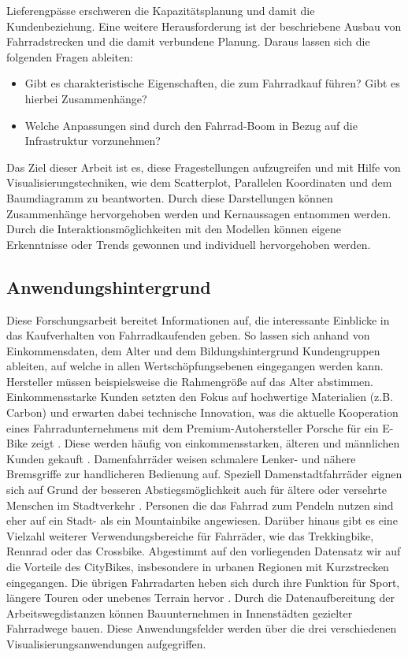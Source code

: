 \documentclass[usegeometry=true]{scrartcl}
\begin{document}
Lieferengpässe erschweren die Kapazitätsplanung und damit die Kundenbeziehung. Eine weitere Herausforderung ist der beschriebene Ausbau von Fahrradstrecken und die damit verbundene Planung. Daraus lassen sich die folgenden Fragen ableiten:
\begin{itemize}
\item Gibt es charakteristische Eigenschaften, die zum Fahrradkauf führen? Gibt es hierbei Zusammenhänge?
\item Welche Anpassungen sind durch den Fahrrad-Boom in Bezug auf die Infrastruktur vorzunehmen?
\end{itemize}
Das Ziel dieser Arbeit ist es, diese Fragestellungen  aufzugreifen und mit Hilfe von Visualisierungstechniken, wie dem Scatterplot, Parallelen Koordinaten und dem Baumdiagramm zu beantworten. Durch diese Darstellungen können Zusammenhänge hervorgehoben werden und Kernaussagen entnommen werden. Durch die Interaktionsmöglichkeiten mit den Modellen können eigene Erkenntnisse oder Trends gewonnen und individuell hervorgehoben werden.    

\subsection{Anwendungshintergrund}


Diese Forschungsarbeit bereitet Informationen auf, die interessante Einblicke in das Kaufverhalten von Fahrradkaufenden geben. So lassen sich anhand von Einkommensdaten, dem Alter und dem Bildungshintergrund Kundengruppen ableiten, auf welche in allen Wertschöpfungsebenen eingegangen werden kann. Hersteller müssen beispielsweise die Rahmengröße auf das Alter abstimmen. Einkommensstarke Kunden setzten den Fokus auf hochwertige Materialien (z.B. Carbon) und erwarten dabei technische Innovation, was die aktuelle Kooperation eines Fahrradunternehmens mit dem Premium-Autohersteller Porsche für ein E-Bike zeigt \cite{Nachrichten.31.08.2021}. Diese werden häufig von einkommensstarken, älteren und männlichen Kunden gekauft \cite{.07.09.2021,FahrradXXLBlog.14.12.2020}. Damenfahrräder weisen schmalere Lenker- und nähere Bremsgriffe zur handlicheren Bedienung auf. Speziell Damenstadtfahrräder eignen sich auf Grund der besseren Abstiegsmöglichkeit auch für ältere oder versehrte Menschen im Stadtverkehr \cite{Radfahren.08.02.2018}.
Personen die das Fahrrad zum Pendeln nutzen sind eher auf ein Stadt- als ein Mountainbike angewiesen.  Darüber hinaus gibt es eine Vielzahl weiterer  Verwendungsbereiche für Fahrräder, wie das Trekkingbike, Rennrad oder das Crossbike. Abgestimmt auf den vorliegenden Datensatz wir auf die Vorteile des CityBikes, insbesondere in urbanen Regionen mit Kurzstrecken eingegangen. Die übrigen Fahrradarten heben sich durch ihre Funktion für Sport, längere Touren oder unebenes Terrain hervor \cite{.04.09.2021}. 
Durch die Datenaufbereitung der Arbeitswegdistanzen können Bauunternehmen in Innenstädten gezielter Fahrradwege bauen. Diese Anwendungsfelder werden über die drei verschiedenen Visualisierungsanwendungen aufgegriffen. 
\end{document}
